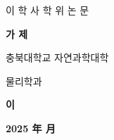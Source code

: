 \begin{titlepage}

\begin{center}
    \Large{이 학 사 학 위 논 문}
    \vspace{1cm}
    
    \textbf{\LARGE 가 제}
    \vspace{8.5cm}
    
    \Large{충북대학교 자연과학대학

    \vspace{0.5cm}
    물리학과

    \vspace{1cm}
    \textbf{이}}
    
    \vspace{1.5cm}
    \large{\textbf{2025 年 月}}

    
\end{center}
    
    
\end{titlepage}
